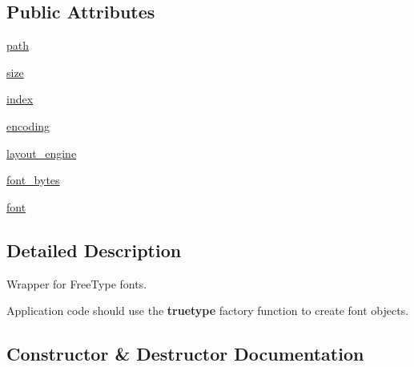 \subsection*{Public Attributes}
\begin{DoxyCompactItemize}
\item 
\hyperlink{classPIL_1_1ImageFont_1_1FreeTypeFont_a8b5643d3fe59d15f8c1b76f053e41f33}{path}
\item 
\hyperlink{classPIL_1_1ImageFont_1_1FreeTypeFont_a3f697fceb4923e030d9ef050648cd065}{size}
\item 
\hyperlink{classPIL_1_1ImageFont_1_1FreeTypeFont_a7fdae09aca4e12612ee730ae2667804f}{index}
\item 
\hyperlink{classPIL_1_1ImageFont_1_1FreeTypeFont_afeaea61a78a2a32629875ec53edf8596}{encoding}
\item 
\hyperlink{classPIL_1_1ImageFont_1_1FreeTypeFont_a05fc99625547b1cc0b20944f66909591}{layout\+\_\+engine}
\item 
\hyperlink{classPIL_1_1ImageFont_1_1FreeTypeFont_a04d1e283c4603291c1860e7b0d097da9}{font\+\_\+bytes}
\item 
\hyperlink{classPIL_1_1ImageFont_1_1FreeTypeFont_a85ce93d3087fb6dd43ae45b408880304}{font}
\end{DoxyCompactItemize}


\subsection{Detailed Description}
Wrapper for Free\+Type fonts. 

Application code should use the {\bfseries truetype} factory function to create font objects. 

\subsection{Constructor \& Destructor Documentation}
\mbox{\label{classPIL_1_1ImageFont_1_1FreeTypeFont_aeff15ef6679ee17ff54bcdef951aeb39}} 
